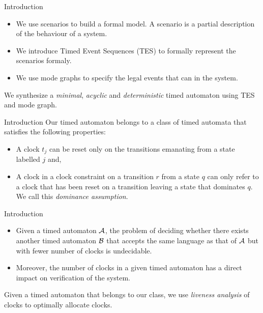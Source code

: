 \documentclass[10pt]{beamer}
\theoremstyle{plain}
\theoremstyle{definition}
\begin{document}
\begin{frame}{Introduction}
	\begin{itemize}
		\item We use scenarios to build a formal model. A scenario is a partial description of the behaviour of a system.
		\item We introduce Timed Event Sequences (TES) to formally represent the scenarios formaly.
		\item We use mode graphs to specify the legal events that can in the system.
	\end{itemize}
	\pause
	\alert{We synthesize a \emph{minimal}, \emph{acyclic} and \emph{deterministic} timed automaton using TES and mode graph.}
\end{frame}

\begin{frame}{Introduction}
	Our timed automaton belongs to a class of timed automata that satisfies the following properties:
	\begin{itemize} 
		\item A clock $t_{j}$ can be reset only on the transitions emanating from a state labelled $j$ and,
		\item A clock in a clock constraint on a transition $r$ from a state $q$ can only refer to a clock that has been reset on a transition leaving a state that dominates $q$. We call this \emph{dominance assumption}.
	\end{itemize}
\end{frame}

\begin{frame}{Introduction}
	\begin{itemize}
		\item Given a timed automaton $\cal A$, the problem of deciding whether there exists another timed automaton $\cal B$ that accepts the same language as that of $\cal A$ but with fewer number of clocks is undecidable.
		\item Moreover, the number of clocks in a given timed automaton has a direct impact on verification of the system.
	\end{itemize}
	\vspace{0.5cm}
	
	\pause
	\alert{	Given a timed automaton that belongs to our class, we use \emph{liveness analysis} of clocks to optimally allocate clocks.}
\end{frame}
\end{document}
